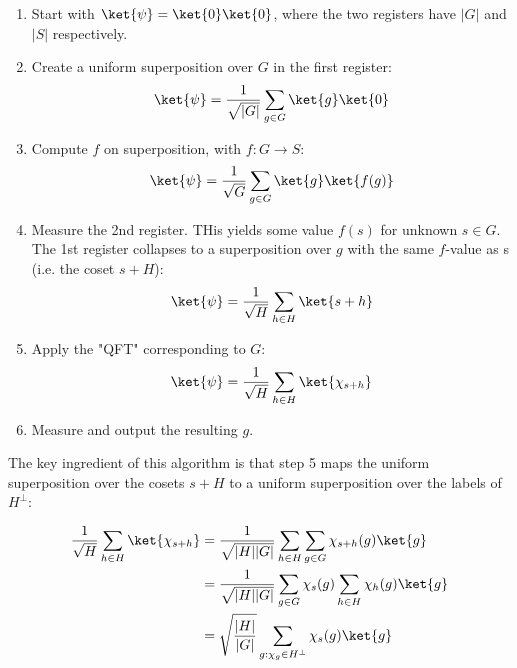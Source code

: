 \begin{enumerate}
    \item Start with $\ket{\psi} = \ket{0}\ket{0}$, where the two registers have $|G|$ and $|S|$ respectively.
    \item Create a uniform superposition over $G$ in the first register: 
    \begin{equation*}
        \ket{\psi} = \frac{1}{\sqrt{|G|}} \sum_{g \in G} \ket{g} \ket{0}
    \end{equation*}
    
    \item Compute $f$ on superposition, with $f: G \rightarrow S$:
    \begin{equation*}
        \ket{\psi} = \frac{1}{\sqrt{G}} \sum_{g \in G} \ket{g} \ket{f(g)}
    \end{equation*}
    
    \item Measure the 2nd register. THis yields some value $f(s)$ for unknown $s \in G$. The 1st register collapses to a superposition over $g$ with the same $f$-value as s (i.e. the coset $s + H$):
    \begin{equation*}
        \ket{\psi} = \frac{1}{\sqrt{H}} \sum_{h \in H} \ket{s + h}
    \end{equation*}
    
    \item Apply the "QFT" corresponding to $G$:
    \begin{equation*}
        \ket{\psi} = \frac{1}{\sqrt{H}} \sum_{h \in H} \ket{\chi_{s+h}}
    \end{equation*}
    
    \item Measure and output the resulting $g$.
\end{enumerate}

The key ingredient of this algorithm is that step 5 maps the uniform superposition over the cosets $s + H$ to a uniform superposition over the labels of $H^\perp$:

\begin{equation*}
\begin{split}
    \frac{1}{\sqrt{H}} \sum_{h \in H} \ket{\chi_{s+h}} & = \frac{1}{\sqrt{|H| |G|}} \sum_{h \in H} \sum_{g \in G} \chi_{s+h} (g) \ket{g} \\
    & = \frac{1}{\sqrt{|H||G|}} \sum_{g \in G} \chi_s(g) \sum_{h \in H} \chi_h (g) \ket{g} \\
    & = \sqrt{\frac{|H|}{|G|}} \sum_{g: \chi_g \in H^\perp} \chi_s(g) \ket{g}
\end{split}
\end{equation*}

